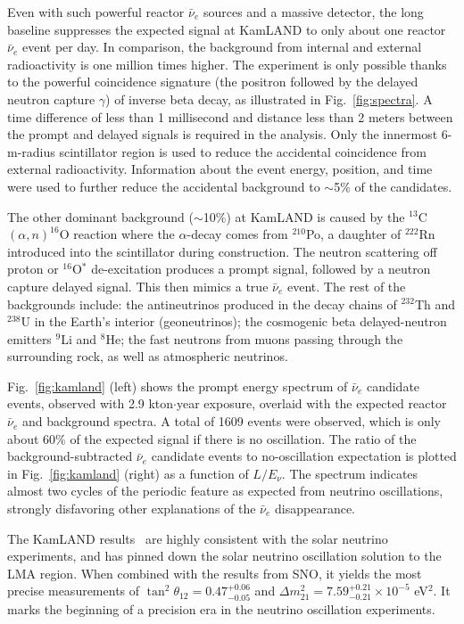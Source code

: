\documentclass[aps,twocolumn,preprintnumbers,amsmath,superscriptaddress,amssymb,floats,nofootinbib]{revtex4-1}
\begin{document}
Even with such powerful reactor $\bar\nu_e$ sources and a massive detector, the long baseline suppresses the expected signal at KamLAND to only about one reactor $\bar\nu_e$ event per day. 
In comparison, the background from internal and external radioactivity is one million times higher. 
The experiment is only possible thanks to the powerful coincidence signature (the positron followed by the delayed neutron capture $\gamma$) of inverse beta decay, as illustrated in Fig.~\ref{fig:spectra}. 
A time difference of less than 1 millisecond and distance less than 2 meters between the prompt and delayed signals is required in the analysis. 
Only the innermost 6-m-radius scintillator region is used to reduce the accidental coincidence from external radioactivity. 
Information about the event energy, position, and time were used to further reduce the accidental background to $\sim$5\% of the candidates.

The other dominant background ($\sim$10\%) at KamLAND is caused by the $^{13}$C$(\alpha,n)^{16}$O reaction where the $\alpha$-decay comes from $^{210}$Po, a daughter of $^{222}$Rn introduced into the scintillator during construction. 
The neutron scattering off proton or $^{16}$O$^*$ de-excitation produces a prompt signal, followed by a neutron capture delayed signal. This then mimics a true $\bar\nu_e$ event. The rest of the backgrounds include: the antineutrinos produced in the decay chains of $^{232}$Th and $^{238}$U in the Earth's interior (geoneutrinos); the cosmogenic beta delayed-neutron emitters $^{9}$Li and $^{8}$He;  the fast neutrons from muons passing through the surrounding rock, as well as atmospheric neutrinos. 

Fig.~\ref{fig:kamland} (left) shows the prompt energy spectrum of $\bar\nu_e$ candidate
events, observed with 2.9 kton$\cdot$year exposure, overlaid with the expected reactor $\bar\nu_{e}$ and background spectra. A total of 1609 events were observed, which is only about 60\% of the expected signal if there is no oscillation. The ratio of the background-subtracted $\bar\nu_e$ candidate events to no-oscillation expectation is plotted in Fig.~\ref{fig:kamland} (right) as a function of $L/E_{\nu}$. The spectrum indicates almost two cycles of the periodic feature as expected from neutrino oscillations, strongly disfavoring other explanations of the $\bar\nu_e$ disappearance.

The KamLAND results~\cite{Kamland03,Kamland05,Kamland08} are highly consistent with the solar neutrino experiments, and has pinned down the solar neutrino oscillation solution to the LMA region. When combined with the results from SNO, it yields the most precise measurements of $\tan^2\theta_{12} = 0.47^{+0.06}_{-0.05}$ and $\Delta m^2_{21} = 7.59^{+0.21}_{-0.21} \times 10^{-5}$ eV$^2$. It marks the beginning of a precision era in the neutrino oscillation experiments.
\end{document}
